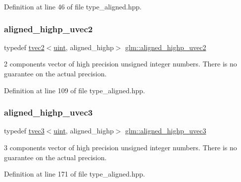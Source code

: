 Definition at line 46 of file type\+\_\+aligned.\+hpp.

\mbox{\label{group__gtc__type__aligned_gadbe09d1af82957ec00a3baaa89120f1e}} 
\subsubsection{\texorpdfstring{aligned\_highp\_uvec2}{aligned\_highp\_uvec2}}
{\footnotesize\ttfamily typedef \mbox{\hyperlink{structglm_1_1tvec2}{tvec2}}$<$\mbox{\hyperlink{group__core__precision_ga4fd29415871152bfb5abd588334147c8}{uint}}, aligned\+\_\+highp$>$ \mbox{\hyperlink{group__gtc__type__aligned_gadbe09d1af82957ec00a3baaa89120f1e}{glm\+::aligned\+\_\+highp\+\_\+uvec2}}}

2 components vector of high precision unsigned integer numbers. There is no guarantee on the actual precision. 

Definition at line 109 of file type\+\_\+aligned.\+hpp.

\mbox{\label{group__gtc__type__aligned_gac7b68f6ca0c6a536c9692bfb885a0006}} 
\subsubsection{\texorpdfstring{aligned\_highp\_uvec3}{aligned\_highp\_uvec3}}
{\footnotesize\ttfamily typedef \mbox{\hyperlink{structglm_1_1tvec3}{tvec3}}$<$\mbox{\hyperlink{group__core__precision_ga4fd29415871152bfb5abd588334147c8}{uint}}, aligned\+\_\+highp$>$ \mbox{\hyperlink{group__gtc__type__aligned_gac7b68f6ca0c6a536c9692bfb885a0006}{glm\+::aligned\+\_\+highp\+\_\+uvec3}}}

3 components vector of high precision unsigned integer numbers. There is no guarantee on the actual precision. 

Definition at line 171 of file type\+\_\+aligned.\+hpp.

\mbox{\label{group__gtc__type__aligned_ga15c8f3d51b9df35dbf8bf2276512588b}} 
